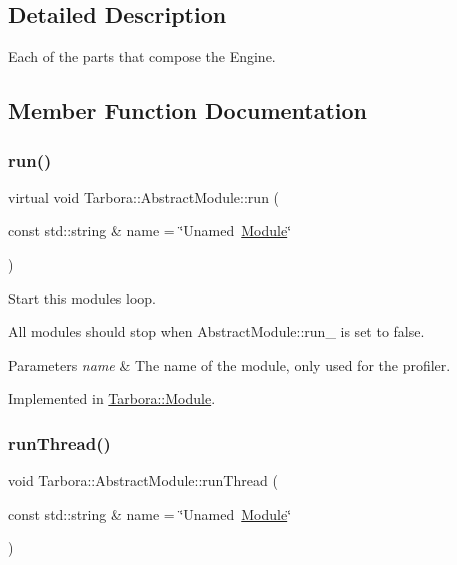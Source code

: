 \subsection{Detailed Description}
Each of the parts that compose the Engine. 

\subsection{Member Function Documentation}
\mbox{\label{classTarbora_1_1AbstractModule_acfb70b92b109b5e8ceae997c8629180a}} 
\subsubsection{\texorpdfstring{run()}{run()}}
{\footnotesize\ttfamily virtual void Tarbora\+::\+Abstract\+Module\+::run (\begin{DoxyParamCaption}\item[{const std\+::string \&}]{name = {\ttfamily \char`\"{}Unamed~\hyperlink{classTarbora_1_1Module}{Module}\char`\"{}} }\end{DoxyParamCaption})\hspace{0.3cm}{\ttfamily [pure virtual]}}



Start this module\textquotesingle{}s loop. 

All modules should stop when Abstract\+Module\+::run\+\_\+ is set to false. 
\begin{DoxyParams}{Parameters}
{\em name} & The name of the module, only used for the profiler. \\
\hline
\end{DoxyParams}


Implemented in \hyperlink{classTarbora_1_1Module_a8c0352045b21b985d3798caa3190c70b}{Tarbora\+::\+Module}.

\mbox{\label{classTarbora_1_1AbstractModule_ae65c482cc7cca2aae3e24811880c6313}} 
\subsubsection{\texorpdfstring{run\+Thread()}{runThread()}}
{\footnotesize\ttfamily void Tarbora\+::\+Abstract\+Module\+::run\+Thread (\begin{DoxyParamCaption}\item[{const std\+::string \&}]{name = {\ttfamily \char`\"{}Unamed~\hyperlink{classTarbora_1_1Module}{Module}\char`\"{}} }\end{DoxyParamCaption})}



